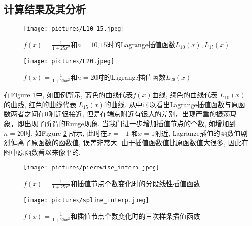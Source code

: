 \documentclass[a4paper]{article}
\begin{document}
\begin{spacing}{1.5}
\begin{CJK*}{GBK}{song}
\section{计算结果及其分析}
\begin{figure}[!htbp]
\centering\texttt{[image: pictures/L10\_15.jpeg]}
\setlength{\abovecaptionskip}{0pt}
\caption{$f(x)=\frac{1}{1+25x^2}$和$n=10,15$时的Lagrange插值函数$L_{10}(x), L_{15}(x)$}\label{figL10}
\setlength{\belowcaptionskip}{0pt}
\end{figure}
\begin{figure}[!htbp]
\centering\texttt{[image: pictures/L20.jpeg]}
\setlength{\abovecaptionskip}{0pt}
\caption{$f(x)=\frac{1}{1+25x^2}$和$n=20$时的Lagrange插值函数$L_{20}(x)$}\label{figL20}
\setlength{\belowcaptionskip}{0pt}
\end{figure}
在Figure \ref{figL10}中, 如图例所示, 蓝色的曲线代表$f( x)$曲线, 绿色的曲线代表 $L_{10}(x)$的曲线, 红色的曲线代表 $L_{15}(x)$的曲线. 从中可以看出Lagrange插值函数与原函数两者之间在0附近很接近, 但是在端点附近有很大的差别，出现严重的振荡现象，即出现了所谓的Runge现象. 当我们进一步增加插值节点的个数, 如增加到$n=20$时, 如Figure \ref{figL20} 所示, 此时在$x=-1$ 和$x=1$附近, Lagrange插值的函数值剧烈偏离了原函数的函数值, 误差非常大. 由于插值函数值比原函数值大很多, 因此在图中原函数看以来像平的.\par
\begin{figure}[!htbp]
\centering\texttt{[image: pictures/piecewise\_interp.jpeg]}
\setlength{\abovecaptionskip}{0pt}
\caption{$f(x)=\frac{1}{1+25x^2}$和插值节点个数变化时的分段线性插值函数}\label{fig_piecewise}
\setlength{\belowcaptionskip}{0pt}
\end{figure}
\begin{figure}[!htbp]
\centering\texttt{[image: pictures/spline\_interp.jpeg]}
\setlength{\abovecaptionskip}{0pt}
\caption{$f(x)=\frac{1}{1+25x^2}$和插值节点个数变化时的三次样条插值函数}\label{fig_spline}
\setlength{\belowcaptionskip}{0pt}
\end{figure}


\end{CJK*}
\end{spacing}
\end{document}
